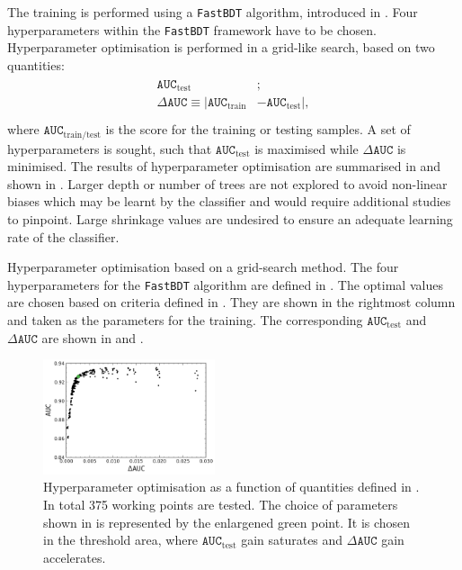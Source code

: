 The training is performed using a \texttt{FastBDT} algorithm, introduced in .
Four hyperparameters within the \texttt{FastBDT} framework have to be chosen.
Hyperparameter optimisation is performed in a grid-like search, based on two quantities:
\begin{align}\label{eq:optimisation_criteria}
    \begin{split}
    \mathtt{AUC}_{\mathrm{test}}&;\\
    \Delta \mathtt{AUC} \equiv |\mathtt{AUC}_{\mathrm{train}}& - \mathtt{AUC}_{\mathrm{test}}|,\\
    \end{split}
\end{align}
where $\mathtt{AUC}_{\mathrm{train}/\mathrm{test}}$ is the \AUC score for the training or testing samples.
A set of hyperparameters is sought, such that $ \mathtt{AUC}_{\mathrm{test}}$ is maximised while $\Delta \mathtt{AUC}$ is minimised.
The results of hyperparameter optimisation are summarised in  and shown in .
Larger depth or number of trees are not explored to avoid non-linear biases which may be learnt by the classifier and would require additional studies to pinpoint.
Large shrinkage values are undesired to ensure an adequate learning rate of the classifier.
\begin{table}[htbp!]
    \centering
    \caption{\label{tab:grid_search}Hyperparameter optimisation based on a grid-search method.
    The four hyperparameters for the \texttt{FastBDT} algorithm are defined in .
    The optimal values are chosen based on criteria defined in .
    They are shown in the rightmost column and taken as the parameters for the training.
    The corresponding $\mathtt{AUC}_{\mathrm{test}}$ and $\Delta \mathtt{AUC}$ are shown in  and .
    }
    
\end{table}
\begin{figure}[htbp!]
    \centering
    \includegraphics[width=0.45\textwidth]{figures/continuum_suppression/hyperpar_optimisation.png}
    \caption{\label{fig:hyper_param}Hyperparameter optimisation as a function of quantities defined in .
    In total 375 working points are tested.
    The choice of parameters shown in  is represented by the enlargened green point.
    It is chosen in the threshold area, where $\mathtt{AUC}_{\mathrm{test}}$ gain saturates and $\Delta \mathtt{AUC}$ gain accelerates.
    }
\end{figure}

